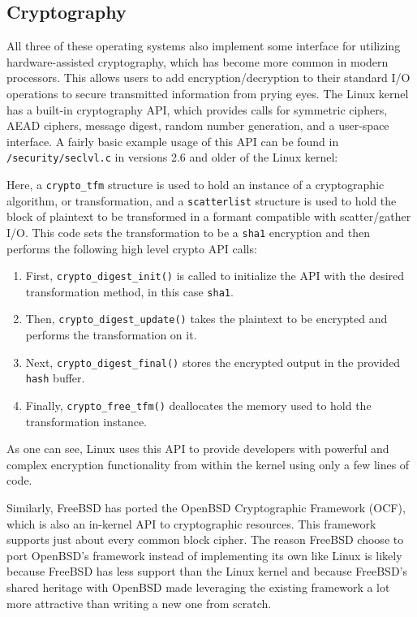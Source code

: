 \documentclass[onecolumn, draftclsnofoot,10pt, compsoc]{IEEEtran}
\begin{document}
\subsection{Cryptography}
All three of these operating systems also implement some interface for utilizing hardware-assisted cryptography, which has become more common in modern processors. This allows users to add encryption/decryption to their standard I/O operations to secure transmitted information from prying eyes. The Linux kernel has a built-in cryptography API, which provides calls for symmetric ciphers, AEAD ciphers, message digest, random number generation, and a user-space interface. A fairly basic example usage of this API can be found in \verb`/security/seclvl.c` in versions 2.6 and older of the Linux kernel:

Here, a \verb`crypto_tfm` structure is used to hold an instance of a cryptographic algorithm, or transformation, and a \verb`scatterlist` structure is used to hold the block of plaintext to be transformed in a formant compatible with scatter/gather I/O. This code sets the transformation to be a \verb`sha1` encryption and then performs the following high level crypto API calls:
\begin{enumerate}
\item First, \verb`crypto_digest_init()` is called to initialize the API with the desired transformation method, in this case \verb`sha1`.
\item Then, \verb`crypto_digest_update()` takes the plaintext to be encrypted and performs the transformation on it.
\item Next, \verb`crypto_digest_final()` stores the encrypted output in the provided \verb`hash` buffer.
\item Finally, \verb`crypto_free_tfm()` deallocates the memory used to hold the transformation instance.
\end{enumerate}
As one can see, Linux uses this API to provide developers with powerful and complex encryption functionality from within the kernel using only a few lines of code.

Similarly, FreeBSD has ported the OpenBSD Cryptographic Framework (OCF), which is also an in-kernel API to cryptographic resources. This framework supports just about every common block cipher. The reason FreeBSD choose to port OpenBSD's framework instead of implementing its own like Linux is likely because FreeBSD has less support than the Linux kernel and because FreeBSD's shared heritage with OpenBSD made leveraging the existing framework a lot more attractive than writing a new one from scratch. 
\end{document}
